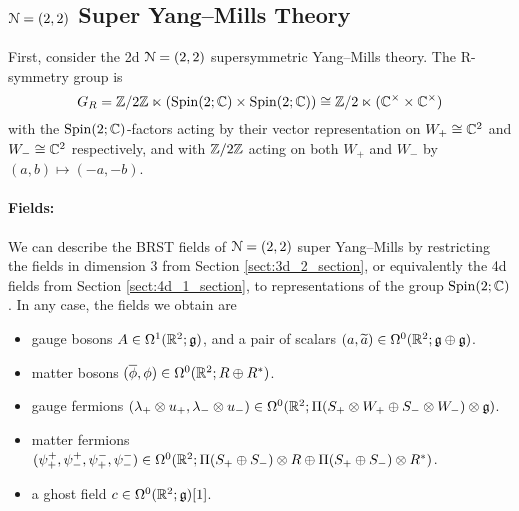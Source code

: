 \documentclass[10pt, oneside]{article}
\begin{document}
\subsection{\texorpdfstring{$\mathcal N=(2,2)$}{N=(2,2)} Super Yang--Mills Theory} \label{sect:2d(2,2)}
First, consider the 2d $\mathcal{N}=(2,2)$ supersymmetric Yang--Mills theory.  The R-symmetry group is $$G_R = \mathbb Z/2\mathbb Z \ltimes (\mathrm{Spin}(2;\mathbb C) \times \mathrm{Spin}(2;\mathbb C)) \cong \mathbb Z/2 \ltimes ( \mathbb C^\times \times \mathbb C^\times)$$ with the $\mathrm{Spin}(2; \mathbb C)$-factors acting by their vector representation on $W_+ \cong \mathbb C^2$ and $W_- \cong \mathbb C^2$ respectively, and with $\mathbb Z/2\mathbb Z$ acting on both $W_+$ and $W_-$ by $(a,b) \mapsto (-a, -b)$. 

\vspace{-10pt}
\paragraph{Fields:} We can describe the BRST fields of $\mathcal{N}=(2,2)$ super Yang--Mills by restricting the fields in dimension 3 from Section \ref{sect:3d_2_section}, or equivalently the 4d fields from Section \ref{sect:4d_1_section}, to representations of the group $\mathrm{Spin}(2;\mathbb C)$.  
In any case, the fields we obtain are
\begin{itemize}
 \item gauge bosons $A \in \Omega^1(\mathbb R^2; \mathfrak{g})$, and a pair of scalars $(a, \widetilde{a}) \in \Omega^0(\mathbb R^2; \mathfrak{g} \oplus \mathfrak{g})$.
 \item matter bosons $(\overline{\phi}, \phi) \in \Omega^0(\mathbb R^2 ; R \oplus R^*)$.
 \item gauge fermions $(\lambda_+ \otimes u_+,\lambda_- \otimes u_-) \in \Omega^0(\mathbb R^2 ; \Pi(S_+ \otimes W_+ \oplus S_- \otimes W_-) \otimes \mathfrak{g})$.
 \item matter fermions $(\psi^+_+,\psi^+_-, \psi^-_+, \psi^-_-) \in \Omega^0(\mathbb R^2 ; \Pi(S_+ \oplus S_-) \otimes R \oplus \Pi(S_+ \oplus S_-) \otimes R^*)$.
 \item a ghost field $c \in \Omega^0(\mathbb R^2; \mathfrak{g})[1]$.
\end{itemize}
\end{document}
